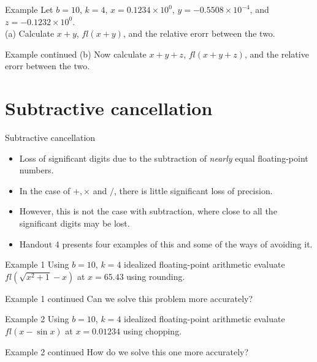 \documentclass[12pt]{beamer}
\begin{document}
\begin{frame}{Example}
Let $b=10$, $k=4$, $x=0.1234 \times 10^0$, $y = -0.5508 \times 10^{-4}$, and $z=-0.1232 \times 10^0$. \\
(a) Calculate $x+y$, $fl(x+y)$, and the relative erorr between the two.
\vspace{3 in}
\end{frame} 

\begin{frame}{Example continued}
(b) Now calculate $x+y+z$, $fl(x+y+z)$, and the relative erorr between the two.
\vspace{3 in}
\end{frame} 

\section{Subtractive cancellation}

\begin{frame}{Subtractive cancellation} 
\begin{itemize}
\item{Loss of significant digits due to the subtraction of {\it nearly} equal floating-point numbers.}
\item{In the case of $+, \times$ and $/$, there is little significant loss of precision.}
\item{However, this is not the case with subtraction, where close to all the significant digits may be lost.}
\item{Handout 4 presents four examples of this and some of the ways of avoiding it.}
\end{itemize} 
\end{frame} 

\begin{frame}{Example 1} 
Using $b=10$, $k=4$ idealized floating-point arithmetic evaluate $fl(\sqrt{x^2+1}-x)$ at $x = 65.43$ using rounding.
\vspace{3 in}
\end{frame} 

\begin{frame}{Example 1 continued} 
Can we solve this problem more accurately?
\vspace{3 in}
\end{frame} 

\begin{frame}{Example 2} 
Using $b=10$, $k=4$ idealized floating-point arithmetic evaluate $fl(x - \sin{x})$ at $x=0.01234$ using chopping.
\vspace{3 in}
\end{frame} 

\begin{frame}{Example 2 continued} 
How do we solve this one more accurately?
\vspace{3 in}
\end{frame} 
\end{document}
